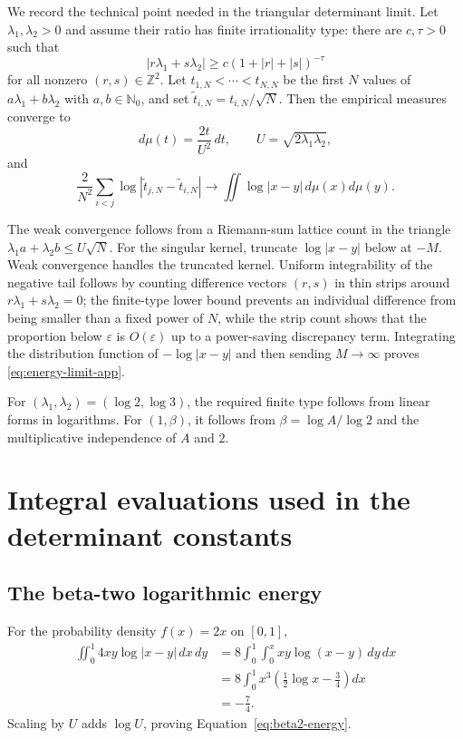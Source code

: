 \documentclass[11pt,oneside]{article}
\theoremstyle{definition}
\theoremstyle{remark}
\newcommand{\Nzero}{\mathbb N_0}
\newcommand{\Z}{\mathbb Z}
\begin{document}
We record the technical point needed in the triangular determinant limit.  Let
$\lambda_1,\lambda_2>0$ and assume their ratio has finite irrationality type:
there are $c,\tau>0$ such that
\[
 |r\lambda_1+s\lambda_2|\ge c(1+|r|+|s|)^{-\tau}
\]
for all nonzero $(r,s)\in\Z^2$.  Let $t_{1,N}<\cdots<t_{N,N}$ be the first $N$
values of $a\lambda_1+b\lambda_2$ with $a,b\in\Nzero$, and set
$\widetilde t_{i,N}=t_{i,N}/\sqrt N$.  Then the empirical measures converge to
\[
 d\mu(t)=\frac{2t}{U^2}\,dt,\qquad U=\sqrt{2\lambda_1\lambda_2},
\]
and
\begin{equation}\label{eq:energy-limit-app}
 \frac{2}{N^2}\sum_{i<j}\log|\widetilde t_{j,N}-\widetilde t_{i,N}|
 \longrightarrow\iint\log|x-y|\,d\mu(x)d\mu(y).
\end{equation}

The weak convergence follows from a Riemann-sum lattice count in the triangle
$\lambda_1a+\lambda_2b\le U\sqrt N$.  For the singular kernel, truncate
$\log|x-y|$ below at $-M$.  Weak convergence handles the truncated kernel.
Uniform integrability of the negative tail follows by counting difference
vectors $(r,s)$ in thin strips around
$r\lambda_1+s\lambda_2=0$; the finite-type lower bound prevents an individual
difference from being smaller than a fixed power of $N$, while the strip count
shows that the proportion below $\varepsilon$ is $O(\varepsilon)$ up to a
power-saving discrepancy term.  Integrating the distribution function of
$-\log|x-y|$ and then sending $M\to\infty$ proves
\eqref{eq:energy-limit-app}.

For $(\lambda_1,\lambda_2)=(\log2,\log3)$, the required finite type follows from
linear forms in logarithms.  For $(1,\beta)$, it follows from
$\beta=\log A/\log2$ and the multiplicative independence of $A$ and $2$.

\section{Integral evaluations used in the determinant constants}

\subsection{The beta-two logarithmic energy}

For the probability density $f(x)=2x$ on $[0,1]$,
\begin{align*}
 \iint_0^1 4xy\log|x-y|\,dx\,dy
 &=8\int_0^1\int_0^xxy\log(x-y)\,dy\,dx\\
 &=8\int_0^1x^3\left(\frac12\log x-\frac34\right)dx\\
 &=-\frac74.
\end{align*}
Scaling by $U$ adds $\log U$, proving
Equation~\eqref{eq:beta2-energy}.
\end{document}

